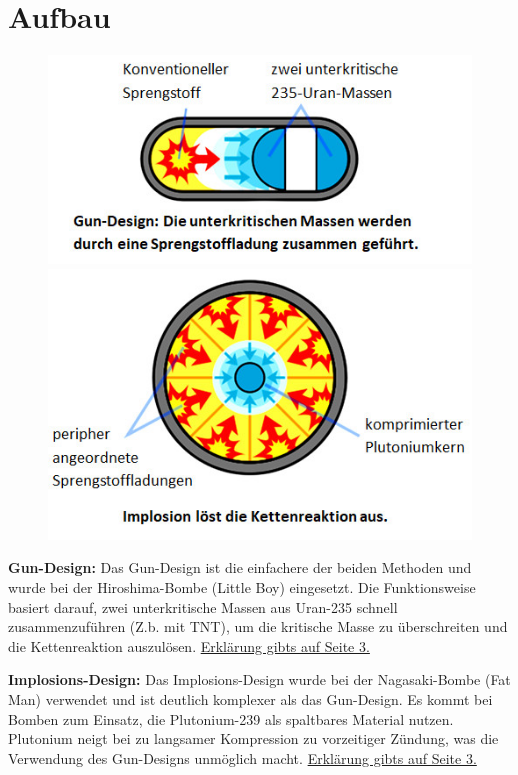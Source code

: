 \documentclass[a4paper,12pt]{article}
\begin{document}
\section{Aufbau}
\begin{figure}
    \vspace{-1cm}
    \includegraphics[scale=0.7]{Gun.png}
    \includegraphics[scale=0.7]{Implosion.png}
\end{figure}

\textbf{Gun-Design:}
Das Gun-Design ist die einfachere der beiden Methoden und wurde bei der Hiroshima-Bombe (Little Boy) eingesetzt. Die Funktionsweise basiert darauf, 
zwei unterkritische Massen aus Uran-235 schnell zusammenzuführen (Z.b. mit TNT), um die kritische Masse zu überschreiten und die Kettenreaktion auszulösen. \hyperlink{gun_section}{Erklärung gibts auf Seite 3.}

\vspace*{2cm}

\noindent\textbf{Implosions-Design:}
Das Implosions-Design wurde bei der Nagasaki-Bombe (Fat Man) verwendet und ist deutlich komplexer als das Gun-Design. Es kommt bei Bomben zum Einsatz, die Plutonium-239 als spaltbares Material nutzen. 
Plutonium neigt bei zu langsamer Kompression zu vorzeitiger Zündung, was die Verwendung des Gun-Designs unmöglich macht. \hyperlink{implosion_section}{Erklärung gibts auf Seite 3.}
\end{document}
